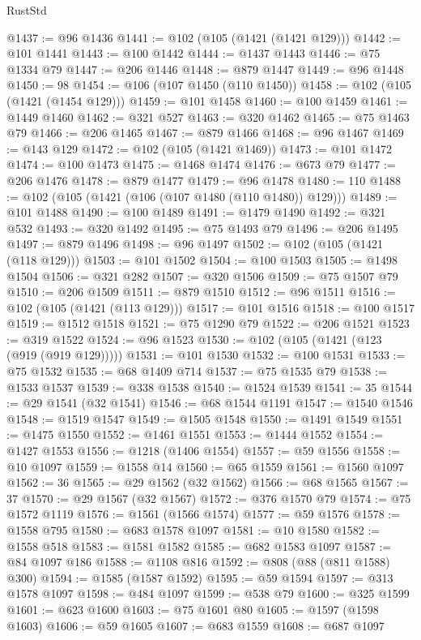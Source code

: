 \begin{lexlean}{RustStd}
\begin{coremodule}
@1437 := @96 @1436
@1441 := @102 (@105 (@1421 (@1421 @129)))
@1442 := @101 @1441
@1443 := @100 @1442
@1444 := @1437 @1443
@1446 := @75 @1334 @79
@1447 := @206 @1446
@1448 := @879 @1447
@1449 := @96 @1448
@1450 := 98
@1454 := @106 (@107 @1450 (@110 @1450))
@1458 := @102 (@105 (@1421 (@1454 @129)))
@1459 := @101 @1458
@1460 := @100 @1459
@1461 := @1449 @1460
@1462 := @321 @527
@1463 := @320 @1462
@1465 := @75 @1463 @79
@1466 := @206 @1465
@1467 := @879 @1466
@1468 := @96 @1467
@1469 := @143 @129
@1472 := @102 (@105 (@1421 @1469))
@1473 := @101 @1472
@1474 := @100 @1473
@1475 := @1468 @1474
@1476 := @673 @79
@1477 := @206 @1476
@1478 := @879 @1477
@1479 := @96 @1478
@1480 := 110
@1488 := @102 (@105 (@1421 (@106 (@107 @1480 (@110 @1480)) @129)))
@1489 := @101 @1488
@1490 := @100 @1489
@1491 := @1479 @1490
@1492 := @321 @532
@1493 := @320 @1492
@1495 := @75 @1493 @79
@1496 := @206 @1495
@1497 := @879 @1496
@1498 := @96 @1497
@1502 := @102 (@105 (@1421 (@118 @129)))
@1503 := @101 @1502
@1504 := @100 @1503
@1505 := @1498 @1504
@1506 := @321 @282
@1507 := @320 @1506
@1509 := @75 @1507 @79
@1510 := @206 @1509
@1511 := @879 @1510
@1512 := @96 @1511
@1516 := @102 (@105 (@1421 (@113 @129)))
@1517 := @101 @1516
@1518 := @100 @1517
@1519 := @1512 @1518
@1521 := @75 @1290 @79
@1522 := @206 @1521
@1523 := @319 @1522
@1524 := @96 @1523
@1530 := @102 (@105 (@1421 (@123 (@919 (@919 @129)))))
@1531 := @101 @1530
@1532 := @100 @1531
@1533 := @75 @1532
@1535 := @68 @1409 @714
@1537 := @75 @1535 @79
@1538 := @1533 @1537
@1539 := @338 @1538
@1540 := @1524 @1539
@1541 := 35
@1544 := @29 @1541 (@32 @1541)
@1546 := @68 @1544 @1191
@1547 := @1540 @1546
@1548 := @1519 @1547
@1549 := @1505 @1548
@1550 := @1491 @1549
@1551 := @1475 @1550
@1552 := @1461 @1551
@1553 := @1444 @1552
@1554 := @1427 @1553
@1556 := @1218 (@1406 @1554)
@1557 := @59 @1556
@1558 := @10 @1097
@1559 := @1558 @14
@1560 := @65 @1559
@1561 := @1560 @1097
@1562 := 36
@1565 := @29 @1562 (@32 @1562)
@1566 := @68 @1565
@1567 := 37
@1570 := @29 @1567 (@32 @1567)
@1572 := @376 @1570 @79
@1574 := @75 @1572 @1119
@1576 := @1561 (@1566 @1574)
@1577 := @59 @1576
@1578 := @1558 @795
@1580 := @683 @1578 @1097
@1581 := @10 @1580
@1582 := @1558 @518
@1583 := @1581 @1582
@1585 := @682 @1583 @1097
@1587 := @84 @1097 @186
@1588 := @1108 @816
@1592 := @808 (@88 (@811 @1588) @300)
@1594 := @1585 (@1587 @1592)
@1595 := @59 @1594
@1597 := @313 @1578 @1097
@1598 := @484 @1097
@1599 := @538 @79
@1600 := @325 @1599
@1601 := @623 @1600
@1603 := @75 @1601 @80
@1605 := @1597 (@1598 @1603)
@1606 := @59 @1605
@1607 := @683 @1559
@1608 := @687 @1097

\end{coremodule}
\end{lexlean}
